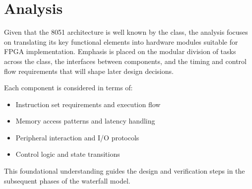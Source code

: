 \chapter{Analysis}

Given that the 8051 architecture is well known by the class, the analysis focuses on translating its
key functional elements into hardware modules suitable for FPGA implementation. Emphasis is placed 
on the modular division of tasks across the class, the interfaces between components, 
and the timing and control flow requirements that will shape later design decisions.

Each component is considered in terms of:
\begin{itemize}
    \item Instruction set requirements and execution flow
    \item Memory access patterns and latency handling
    \item Peripheral interaction and I/O protocols
    \item Control logic and state transitions
\end{itemize}

This foundational understanding guides the design and verification steps in the subsequent
 phases of the waterfall model.
